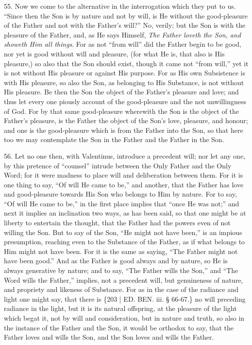 55. Now we come to the
alternative in the interrogation which they put to us. ``Since then the
Son is by nature and not by will, is He without the good-pleasure of
the Father and not with the Father's will?'' No, verily; but the Son is
with the pleasure of the Father, and, as He says Himself, \emph{The
Father loveth the Son, and showeth Him all things}. For as not ``from
will'' did the Father begin to be good, nor yet is good without will
and pleasure, (for what He is, that also is His pleasure,) so also
that the Son should exist, though it came not ``from will,'' yet
it is not without His pleasure or against His purpose. For as His own
Subsistence is with His pleasure, so also the Son, as belonging to His
Substance, is not without His pleasure. Be then the Son the object of
the Father's pleasure and love; and thus let every one piously account
of the good-pleasure and the not unwillingness of God. For by that
same good-pleasure wherewith the Son is the object of the Father's
pleasure, is the Father the object of the Son's love, pleasure, and
honour; and one is the good-pleasure which is from the Father into the
Son, so that here too we may contemplate the Son in the Father and the
Father in the Son.

56. Let no one then, with
Valentinus, introduce a precedent will; nor let any one, by this
pretence of ``counsel'' intrude between the Only Father and the Only
Word; for it were madness to place will and deliberation between them.
For it is one thing to say, ``Of will He came to be,'' and another, that
the Father has love and good-pleasure towards His Son who belongs to
Him by nature. For to say, ``Of will He came to be,'' in the first place
implies that ``once He was not;'' and next it implies an inclination two
ways, as has been said, so that one might be at liberty to entertain
the thought, that the Father had the powers even of not willing the
Son. But to say of the Son, ``He might not have been,'' is an impious
presumption, reaching even to the Substance of the Father, as if what
belongs to Him might not have been. For it is the same as saying, ``The
Father might not have been good.'' And as the Father is good always and
by nature, so He is always generative by nature; and to say, ``The
Father wills the Son,'' and ``The Word wills the Father,'' implies, not a
precedent will, but genuineness of nature, and propriety and likeness
of Substance. For as in the case of the radiance and light one might
say, that there is \{203 | ED. BEN. iii. § 66-67.\}
no will preceding radiance in the light, but it is its natural
offspring, at the pleasure of the light which begat it, not by will
and consideration, but in nature and truth, so also in the instance of
the Father and the Son, it would be orthodox to say, that the Father
loves and wills the Son, and the Son loves and wills the Father.

